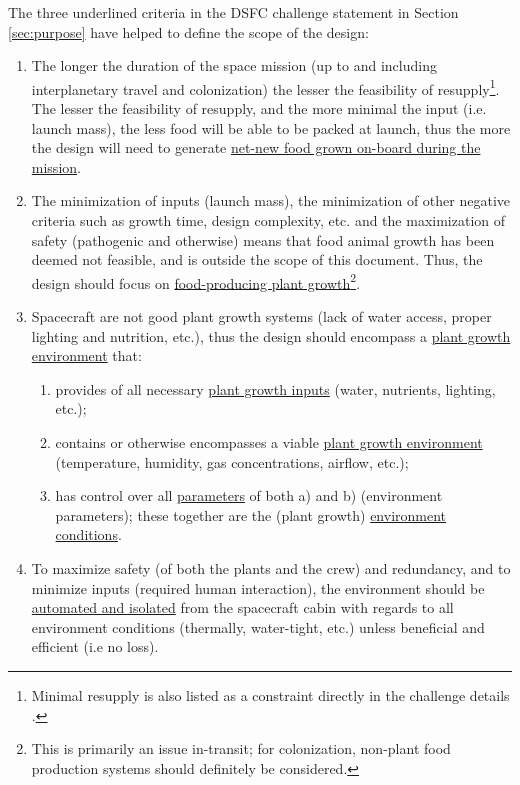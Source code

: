 \documentclass{../tex/report}
\begin{document}
The three underlined criteria in the DSFC challenge statement in Section \ref{sec:purpose} have helped to define the scope of the design:
\begin{enumerate}[label=SC\arabic*., ref=SC\arabic*]
    \item \label{sc:1} The longer the duration of the space mission (up to and including interplanetary travel and colonization) the lesser the feasibility of resupply\footnote{Minimal resupply is also listed as a constraint directly in the challenge details \cite{applicantguide,dsfc-phase2}.}. The lesser the feasibility of resupply, and the more minimal the input (i.e. launch mass), the less food will be able to be packed at launch, thus the more the design will need to generate \uline{net-new food grown on-board during the mission}.
    \item \label{sc:2} The minimization of inputs (launch mass), the minimization of other negative criteria such as growth time, design complexity, etc. and the maximization of safety (pathogenic and otherwise) means that food animal growth has been deemed not feasible, and is outside the scope of this document. Thus, the design should focus on \uline{food-producing plant growth}\footnote{This is primarily an issue in-transit; for colonization, non-plant food production systems should definitely be considered.}.
    \item \label{sc:3} Spacecraft are not good plant growth systems (lack of water access, proper lighting and nutrition, etc.), thus the design should encompass a \uline{plant growth environment} that:
    \begin{enumerate}[label=SC3\alph*., ref=SC3\alph*]
        \item \label{sc:3a} provides of all necessary \uline{plant growth inputs} (water, nutrients, lighting, etc.);
        \item \label{sc:3b} contains or otherwise encompasses a viable \uline{plant growth environment} (temperature, humidity, gas concentrations, airflow, etc.);
        \item \label{sc:3c} has control over all \uline{parameters} of both a) and b) (environment parameters); these together are the (plant growth) \uline{environment conditions}.
    \end{enumerate}
    \item \label{sc:4} To maximize safety (of both the plants and the crew) and redundancy, and to minimize inputs (required human interaction), the environment should be \uline{automated and isolated} from the spacecraft cabin with regards to all environment conditions (thermally, water-tight, etc.) unless beneficial and efficient (i.e no loss).

\end{enumerate}
\end{document}
